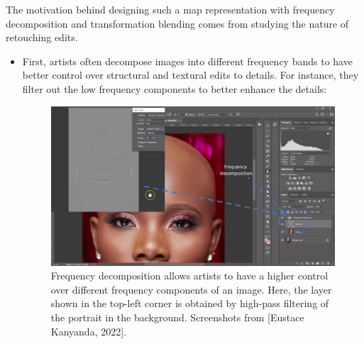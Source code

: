 The motivation behind designing such a map representation with frequency decomposition and transformation blending comes from studying the nature of retouching edits. 
\begin{itemize}
\item First, artists often decompose images into different frequency bands to have better control over structural and textural edits to details. For instance, they filter out the low frequency components to better enhance the details:

\begin{figure}[ht]
\centering
\includegraphics[width=\columnwidth]{Chapters/detail-retouching-figs/PS1.pdf}
    \caption{Frequency decomposition allows artists to have a higher control over different frequency components of an image. Here, the layer shown in the top-left corner is obtained by high-pass filtering of the portrait in the background. Screenshots from [Eustace Kanyanda, 2022].}

\label{fig:PS-high-pass}
\end{figure}


\end{itemize}
